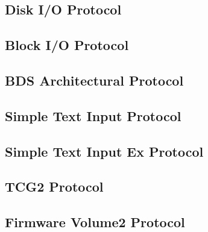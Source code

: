 \subsection{Disk \acs{I/O} Protocol}

\clearpage

\subsection{Block \acs{I/O} Protocol}

\clearpage

\subsection{\acl{BDS} Architectural Protocol}

\clearpage

\subsection{Simple Text Input Protocol}

\clearpage

\subsection{Simple Text Input Ex Protocol}

\clearpage

\subsection{\acs{TCG}2 Protocol}


\clearpage
\subsection{Firmware Volume2 Protocol}

\clearpage

